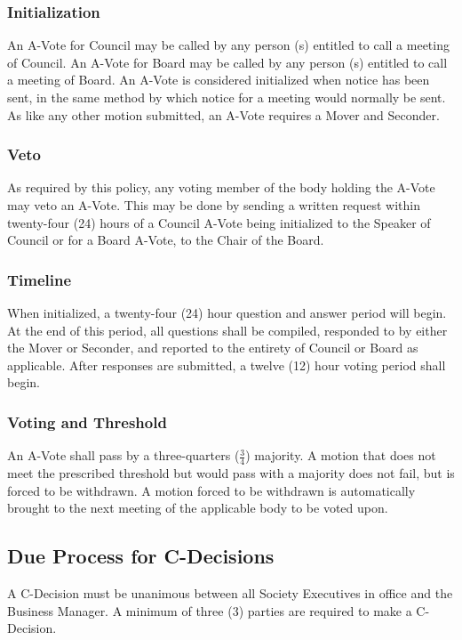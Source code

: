 \subsubsection{Initialization}
An A-Vote for Council may be called by any person (s) entitled to call a meeting of Council. 
An A-Vote for Board may be called by any person (s) entitled to call a meeting of Board.  
An A-Vote is considered initialized when notice has been sent, in the same method by which notice for a meeting would normally be sent. 
As like any other motion submitted, an A-Vote requires a Mover and Seconder.

\subsubsection{Veto}
As required by this policy, any voting member of the body holding the A-Vote may veto an A-Vote.  This may be done by sending a written request within twenty-four (24) hours of a Council A-Vote being initialized to the Speaker of Council or for a Board A-Vote, to the Chair of the Board.

\subsubsection{Timeline}
When initialized, a twenty-four (24) hour question and answer period will begin.  
At the end of this period, all questions shall be compiled, responded to by either the Mover or Seconder, and reported to the entirety of Council or Board as applicable. 
After responses are submitted, a twelve (12) hour voting period shall begin.

\subsubsection{Voting and Threshold}
An A-Vote shall pass by a three-quarters ($\frac{3}{4}$) majority.  
A motion that does not meet the prescribed threshold but would pass with a majority does not fail, but is forced to be withdrawn.  
A motion forced to be withdrawn is automatically brought to the next meeting of the applicable body to be voted upon.

\subsection{Due Process for C-Decisions}
A C-Decision must be unanimous between all Society Executives in office and the Business Manager.  
A minimum of three (3) parties are required to make a C-Decision.
